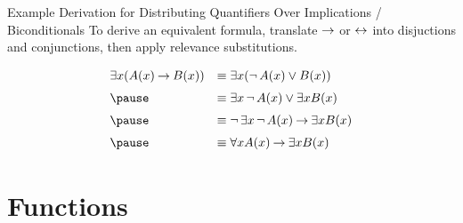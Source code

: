 \documentclass[style=sailor,size=12pt]{powerdot}
\begin{document}
\begin{wideslide}[bm=,toc=]{Example Derivation for Distributing Quantifiers Over
Implications / Biconditionals}
To derive an equivalent formula, translate $\mathbin{\rightarrow}$ or $\mathbin{\leftrightarrow}$ into disjuctions and
conjunctions, then apply relevance substitutions.
\begin{displaymath}
\def\arraystretch{1.5}
\begin{array}{ll}
\exists x (A(x) \imp B(x))  & \equiv \exists x(\ngg A(x) \lor B(x)) \\
\pause &\equiv \exists x\ngg A(x) \lor \exists x B(x) \\
\pause  &\equiv \ngg \exists x\ngg A(x) \imp \exists x B(x) \\
\pause &\equiv \forall x A(x) \imp \exists x B(x) \\

\end{array}
\end{displaymath}

\end{wideslide}

\section[slide=true]{Functions}
%
%
\end{document}
